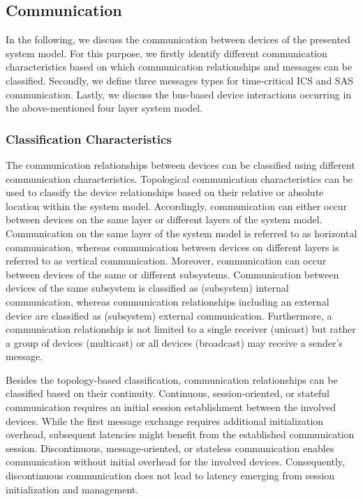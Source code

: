 \subsection{Communication}
\label{sec:approach:system_model:communication}
In the following, we discuss the communication between devices of the presented system model.
For this purpose, we firstly identify different communication characteristics based on which communication relationships and messages can be classified.
Secondly, we define three messages types for time-critical ICS and SAS communication.
Lastly, we discuss the bus-based device interactions occurring in the above-mentioned four layer system model.

\subsubsection{Classification Characteristics}
The communication relationships between devices can be classified using different communication characteristics.
Topological communication characteristics can be used to classify the device relationships based on their relative or absolute location within the system model.
Accordingly, communication can either occur between devices on the same layer or different layers of the system model.
Communication on the same layer of the system model is referred to as horizontal communication, whereas communication between devices on different layers is referred to as vertical communication.
Moreover, communication can occur between devices of the same or different subsystems.
Communication between devices of the same subsystem is classified as (subsystem) internal communication, whereas communication relationships including an external device are classified as (subsystem) external communication.
Furthermore, a communication relationship is not limited to a single receiver (unicast) but rather a group of devices (multicast) or all devices (broadcast) may receive a sender's message.

Besides the topology-based classification, communication relationships can be classified based on their continuity.
Continuous, session-oriented, or stateful communication requires an initial session establishment between the involved devices.
While the first message exchange requires additional initialization overhead, subsequent latencies might benefit from the established communication session.
Discontinuous, message-oriented, or stateless communication enables communication without initial overhead for the involved devices.
Consequently, discontinuous communication does not lead to latency emerging from session initialization and management.

